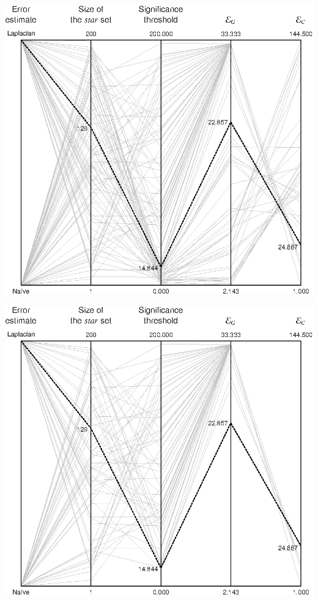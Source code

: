 \documentclass{article}
\begin{document}
\centerline{\includegraphics{cn2_monks2_generalization.ps}}

\centerline{\includegraphics{cn2_monks2_conditions.ps}}
\end{document}
